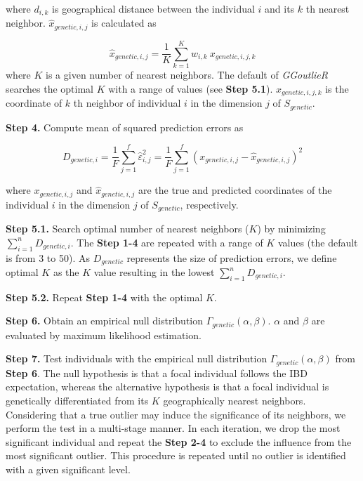 \documentclass[11pt]{article}
\begin{document}
where $d_{i,k}$ is geographical distance between the individual $i$ and its $k$ th nearest neighbor.
$\hat{x}_{genetic,i,j}$ is calculated as

\begin{equation} \label{wknn_eq1}
\hat{x}_{genetic,i,j}=\frac{1}{K}\sum_{k=1}^{K}w_{i,k}\ x_{genetic,i,j,k}
\end{equation}
where $K$ is a given number of nearest neighbors.
The default of \textit{GGoutlieR} searches the optimal $K$ with a range of values (see \textbf{Step 5.1}).
$x_{genetic,i,j,k}$ is the coordinate of $k$ th neighbor of individual $i$ in the dimension $j$ of $S_{genetic}$.

\textbf{Step 4.} Compute mean of squared prediction errors as

\begin{equation} \label{Dg_eq}
D_{genetic, i}=\frac{1}{F}\sum_{j=1}^{f} \hat{\varepsilon}_{i,j}^2 =\frac{1}{F}\sum_{j=1}^{f} (x_{genetic,i,j} - \hat{x}_{genetic,i,j})^2
\end{equation}

where $x_{genetic,i,j}$ and $\hat{x}_{genetic,i,j}$ are the true and predicted coordinates of the individual $i$ in the dimension $j$ of $S_{genetic}$, respectively.

\textbf{Step 5.1.} Search optimal number of nearest neighbors ($K$) by minimizing $\sum_{i=1}^{n}D_{genetic,i}$.
The \textbf{Step 1-4} are repeated with a range of $K$ values (the default is from 3 to 50).
As $D_{genetic}$ represents the size of prediction errors, we define optimal $K$ as the $K$ value resulting in the lowest $\sum_{i=1}^{n}D_{genetic,i}$.


\textbf{Step 5.2.} Repeat \textbf{Step 1-4} with the optimal $K$.

\textbf{Step 6.} Obtain an empirical null distribution $\Gamma_{genetic}(\alpha,\beta)$. $\alpha$ and $\beta$ are evaluated by maximum likelihood estimation.

\textbf{Step 7.} Test individuals with the empirical null distribution $\Gamma_{genetic}(\alpha,\beta)$ from \textbf{Step 6}. The null hypothesis is that a focal individual follows the IBD expectation, whereas the alternative hypothesis is that a focal individual is genetically differentiated from its $K$ geographically nearest neighbors.
Considering that a true outlier may induce the significance of its neighbors, we perform the test in a multi-stage manner.
In each iteration, we drop the most significant individual and repeat the \textbf{Step 2-4} to exclude the influence from the most significant outlier.
This procedure is repeated until no outlier is identified with a given significant level.
\end{document}
